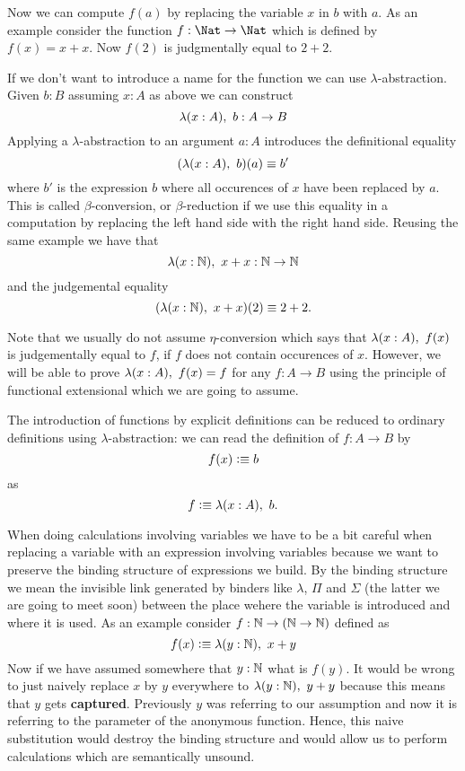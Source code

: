 Now we can compute $f(a)$ by replacing the variable $x$ in $b$ with
$a$. As an example consider the function $f : \Nat \to \Nat$ which is
defined by $f(x) = x+x$. Now $f(2)$ is judgmentally equal to $2+2$.

If we don't want to introduce a name for the function we can use
$\lambda$-abstraction. Given $b : B$ assuming $x:A$ as above we can
construct 
\[ \lam{x:A}b : A \to B \]
Applying a $\lambda$-abstraction to an argument $a:A$ introduces the
definitional equality 
\[(\lam{x:A}b)(a) \jdeq b'\]
 where $b'$ is the
expression $b$ where all occurences of $x$ have been replaced by $a$.
This is called $\beta$-conversion, or $\beta$-reduction if we use this
equality in a computation by replacing the left hand side with the
right hand side. Reusing the same example we have that
\[ \lam{x:\nat}x+x : \nat \to \nat \]
and the judgemental equality
\[ (\lam{x:\nat}x+x)(2) \jdeq 2+2. \]

Note that we usually do not assume $\eta$-conversion which says that $\lam{x:A}f(x)$ is judgementally equal to $f$, if $f$ does not contain occurences of $x$. However, we will be able to prove $\lam{x:A} f(x) = f$ for any $f:A \to B$ using the principle of functional extensional which we are going to assume.

The introduction of functions by explicit definitions can be reduced
to ordinary definitions using $\lambda$-abstraction: we can read 
the definition of $f: A\to B$ by
\[ f(x) \vcentcolon\equiv b \]
as 
\[ f \defeq \lam{x:A}b .\]

When doing calculations involving variables we have to be a bit
careful when replacing a variable with an expression involving
variables because we want to preserve the binding structure of
expressions we build. By the binding structure we mean the
invisible link generated by binders like $\lambda$, $\Pi$ and
$\Sigma$ (the latter we are going to meet soon) between the place wehere the variable is introduced and where it is used. As an example consider $f : \mathbb{N} \to (\mathbb{N} \to \mathbb{N})$
defined as 
\[ f(x) \defeq \lam{y:\nat} x + y \] 
Now if we have assumed somewhere that $y : \mathbb{N}$ what is $f(y)$. It would be wrong to just naively replace $x$ by $y$ everywhere to $\lam{y:\nat} y + y$ because this means that $y$ gets \textbf{captured}. Previously $y$ was referring to our assumption and now it is referring to the parameter of the anonymous function. Hence, this naive substitution would destroy the binding structure and would allow us to perform calculations which are semantically unsound.

